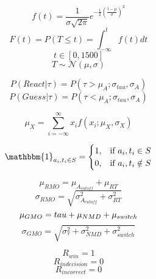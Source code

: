 \documentclass[12pt,letterpaper]{article}
\begin{document}
\begin{equation}
    f(t) = \frac{1}{\sigma\sqrt{2\pi}}e^{-\frac{1}{2}(\frac{t-\mu}{\sigma})^2}
\end{equation}
\begin{equation}
    F(t) = P(T\leq t) = \int_{-\infty}^{t} f(t)dt
\end{equation}
\begin{equation}
    t \in [0,1500]
\end{equation}
\begin{equation}
    T\sim\mathcal{N}(\mu,\sigma)
\end{equation}

\begin{equation}
    P(React|\tau) = P(\tau>\mu_{A}; \sigma_{tau}, \sigma_{A})
\end{equation}
\begin{equation}
    P(Guess|\tau) = P(\tau<\mu_{A}; \sigma_{tau}, \sigma_{A})
\end{equation}

\begin{equation}
    \mu_{X} = \sum_{i = -\infty}^{\infty}x_{i}f(x_{i};\mu_{X}, \sigma_{X})
\end{equation}
   
\begin{equation}
    \mathbbm{1}_{a_{i},t_{i} \in S} = 
    \begin{cases}
        1, & \text{if } a_{i},t_{i} \in S \\
        0, & \text{if }  a_{i},t_{i} \notin S
    \end{cases}    
\end{equation}



\begin{equation}
    \mu_{RMO} = \mu_{A_{cutoff}} + \mu_{RT}
\end{equation}
\begin{equation}
    \sigma_{RMO} = \sqrt{\sigma_{A_{cutoff}}^2 + \sigma_{RT}^2}
\end{equation}
\begin{equation}
    \mu_{GMO} = \\tau +  \mu_{NMD} + \mu_{switch}
\end{equation}
\begin{equation}
    \sigma_{GMO} = \sqrt{\sigma_{\tau}^2 + \sigma_{NMD}^2 + \sigma_{switch}^2}
\end{equation}


\begin{equation}
    R_{win} = 1
\end{equation}
\begin{equation}
    R_{indecision} = 0
\end{equation}
\begin{equation}
    R_{incorrect} = 0
\end{equation}
\end{document}
